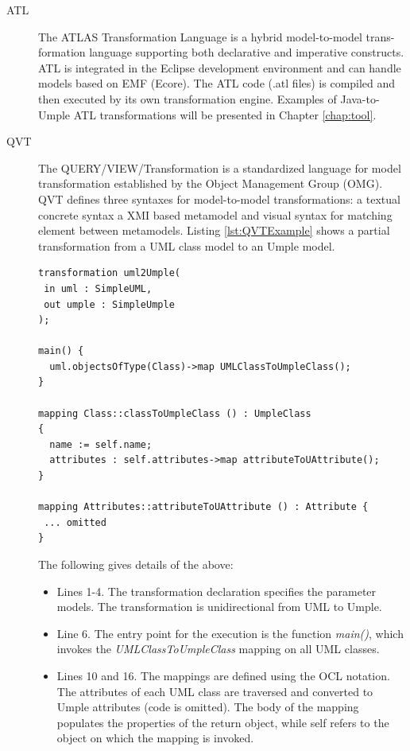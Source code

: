 \begin{description}
\item[ATL]
The ATLAS Transformation Language \cite{atl} is a hybrid model-to-model trans-formation language supporting both declarative and imperative constructs. ATL is integrated in the Eclipse development environment and can handle models based on EMF (Ecore). The ATL code (.atl files) is compiled and then executed by its own transformation engine. Examples of Java-to-Umple ATL transformations will be presented in Chapter \ref{chap:tool}.

\item[QVT]
The QUERY/VIEW/Transformation \cite{QVTMain} is a standardized language for model transformation established by the Object Management Group (OMG). QVT defines three syntaxes for model-to-model transformations: a textual concrete syntax a XMI based metamodel and visual syntax for matching element between metamodels.
Listing \ref{lst:QVTExample} shows a partial transformation from a UML class model to an Umple model.

\begin{lstlisting}[style=java,label=lst:QVTExample, caption=A basic QVT transformation]
transformation uml2Umple(
 in uml : SimpleUML,
 out umple : SimpleUmple
);

main() {
  uml.objectsOfType(Class)->map UMLClassToUmpleClass();
}

mapping Class::classToUmpleClass () : UmpleClass
{
  name := self.name;
  attributes : self.attributes->map attributeToUAttribute();
}

mapping Attributes::attributeToUAttribute () : Attribute {
 ... omitted
}
\end{lstlisting}

The following gives details of the above:

\begin{itemize}

\item Lines 1-4. The transformation declaration specifies the parameter models. The transformation is unidirectional from UML to Umple.

\item Line 6. The entry point for the execution is the function \textit{main()}, which invokes the \textit{UMLClassToUmpleClass} mapping on all UML classes. 

\item Lines 10 and 16. The mappings are defined using the OCL notation. The attributes of each UML class are traversed and converted to Umple attributes (code is omitted). The body of the mapping populates the properties of the return object, while self refers to the object on which the mapping is invoked.
\end{itemize}


\end{description}
